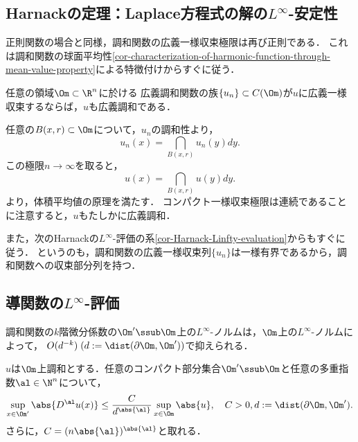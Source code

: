 \documentclass[uplatex,dvipdfmx]{jsreport}
\begin{document}
\subsection{Harnackの定理：Laplace方程式の解の$L^\infty$-安定性}

\begin{tcolorbox}[colframe=ForestGreen, colback=ForestGreen!10!white,breakable,colbacktitle=ForestGreen!40!white,coltitle=black,fonttitle=\bfseries\sffamily,
title=]
    正則関数の場合と同様，調和関数の広義一様収束極限は再び正則である．
    これは調和関数の球面平均性\ref{cor-characterization-of-harmonic-function-through-mean-value-property}による特徴付けからすぐに従う．
\end{tcolorbox}

\begin{proposition}\label{cor-Harnack-L-infty-stability}
    任意の領域$\Om\subset\R^n$に於ける
    広義調和関数の族$\{u_n\}\subset C(\Om)$が$u$に広義一様収束するならば，$u$も広義調和である．
\end{proposition}
\begin{Proof}
    任意の$B(x,r)\subset\Om$について，$u_n$の調和性より，
    \[u_n(x)=\dint_{B(x,r)}u_n(y)dy.\]
    この極限$n\to\infty$を取ると，
    \[u(x)=\dint_{B(x,r)}u(y)dy.\]
    より，体積平均値の原理を満たす．
    コンパクト一様収束極限は連続であることに注意すると，$u$もたしかに広義調和．
\end{Proof}
\begin{remarks}
    また，次のHarnackの$L^\infty$-評価の系\ref{cor-Harnack-Linfty-evaluation}からもすぐに従う．
    というのも，調和関数の広義一様収束列$\{u_n\}$は一様有界であるから，調和関数への収束部分列を持つ．
\end{remarks}

\subsection{導関数の$L^\infty$-評価}

\begin{tcolorbox}[colframe=ForestGreen, colback=ForestGreen!10!white,breakable,colbacktitle=ForestGreen!40!white,coltitle=black,fonttitle=\bfseries\sffamily,
title=]
    調和関数の$k$階微分係数の$\Om'\ssub\Om$上の$L^\infty$-ノルムは，$\Om$上の$L^\infty$-ノルムによって，
    $O(d^{-k})\;(d:=\dist(\partial\Om,\Om'))$で抑えられる．
\end{tcolorbox}

\begin{theorem}[Harnackの評価]\label{thm-Harnack-evaluation-of-derivative}
    $u$は$\Om$上調和とする．任意のコンパクト部分集合$\Om'\ssub\Om$と任意の多重指数$\al\in\N^n$について，
    \[\sup_{x\in\Om'}\abs{D^\al u(x)}\le\frac{C}{d^{\abs{\al}}}\sup_{x\in\Om}\abs{u},\quad  C>0,d:=\dist(\partial\Om,\Om').\]
    さらに，$C=(n\abs{\al})^{\abs{\al}}$と取れる．
\end{theorem}
\end{document}
